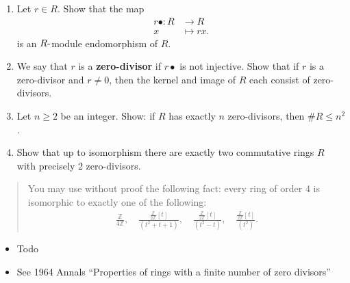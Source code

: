 \begin{enumerate}
\def\labelenumi{\alph{enumi}.}
\item
  Let \(r \in R\). Show that the map
  \begin{align*}
  r\bullet : R &\to R \\
  x &\mapsto r x
  .\end{align*}
  is an \(R{\hbox{-}}\)module endomorphism of \(R\).
\item
  We say that \(r\) is a \textbf{zero-divisor} if \(r\bullet\) is not
  injective. Show that if \(r\) is a zero-divisor and \(r \neq 0\), then
  the kernel and image of \(R\) each consist of zero-divisors.
\item
  Let \(n \geq 2\) be an integer. Show: if \(R\) has exactly \(n\)
  zero-divisors, then \(\#R \leq n^2\) .
\item
  Show that up to isomorphism there are exactly two commutative rings
  \(R\) with precisely 2 zero-divisors.
\end{enumerate}

\begin{quote}
You may use without proof the following fact: every ring of order 4 is
isomorphic to exactly one of the following:
\begin{align*}
\frac{ {\mathbb{Z}}}{ 4{\mathbb{Z}}}, \quad
\frac{ \frac{  {\mathbb{Z}}}{ 2{\mathbb{Z}}} [t]}{(t^2 + t + 1)}, \quad
\frac{ \frac{ {\mathbb{Z}}}{ 2{\mathbb{Z}}} [t]}{ (t^2 - t)}, \quad
\frac{ \frac{ {\mathbb{Z}}}{2{\mathbb{Z}}}[t]}{(t^2 )}
.\end{align*}
\end{quote}

\begin{concept}

\envlist

\begin{itemize}
\tightlist
\item
  Todo
\item
  See 1964 Annals ``Properties of rings with a finite number of zero
  divisors''
\end{itemize}

\end{concept}

